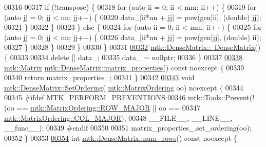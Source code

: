 \begin{DoxyCode}
00316 
00317   \textcolor{keywordflow}{if} (!transpose) \{
00318     \textcolor{keywordflow}{for} (\textcolor{keyword}{auto} ii = 0; ii < mm; ii++) \{
00319       \textcolor{keywordflow}{for} (\textcolor{keyword}{auto} jj = 0; jj < nn; jj++) \{
00320         data\_[ii*nn + jj] = pow(gen[ii], (\textcolor{keywordtype}{double}) jj);
00321       \}
00322     \}
00323   \} \textcolor{keywordflow}{else} \{
00324     \textcolor{keywordflow}{for} (\textcolor{keyword}{auto} ii = 0; ii < mm; ii++) \{
00325       \textcolor{keywordflow}{for} (\textcolor{keyword}{auto} jj = 0; jj < nn; jj++) \{
00326         data\_[ii*nn + jj] = pow(gen[jj], (\textcolor{keywordtype}{double}) ii);
00327       \}
00328     \}
00329   \}
00330 \}
00331 
\hypertarget{mtk__dense__matrix_8cc_source_l00332}{}\hyperlink{classmtk_1_1DenseMatrix_a8d4a0df33bd4e4edf5d2fe5539885b85}{00332} \hyperlink{classmtk_1_1DenseMatrix_a8d4a0df33bd4e4edf5d2fe5539885b85}{mtk::DenseMatrix::~DenseMatrix}() \{
00333 
00334   \textcolor{keyword}{delete} [] data\_;
00335   data\_ = \textcolor{keyword}{nullptr};
00336 \}
00337 
\hypertarget{mtk__dense__matrix_8cc_source_l00338}{}\hyperlink{classmtk_1_1DenseMatrix_a5aa83a0643f27a4652ea97630edf7143}{00338} \hyperlink{classmtk_1_1Matrix}{mtk::Matrix} \hyperlink{classmtk_1_1DenseMatrix_a5aa83a0643f27a4652ea97630edf7143}{mtk::DenseMatrix::matrix\_properties}() const 
      noexcept \{
00339 
00340   \textcolor{keywordflow}{return} matrix\_properties\_;
00341 \}
00342 
\hypertarget{mtk__dense__matrix_8cc_source_l00343}{}\hyperlink{classmtk_1_1DenseMatrix_a178e63f365cf8c547dc5020c60357f5e}{00343} \textcolor{keywordtype}{void} \hyperlink{classmtk_1_1DenseMatrix_a178e63f365cf8c547dc5020c60357f5e}{mtk::DenseMatrix::SetOrdering}(
      \hyperlink{group__c02-enums_ga622801bd9f912d0f976c3e383f5f581c}{mtk::MatrixOrdering} oo) noexcept \{
00344 
00345 \textcolor{preprocessor}{  #ifdef MTK\_PERFORM\_PREVENTIONS}
00346   \hyperlink{classmtk_1_1Tools_a332324c6f25e66be9dff48c5987a3b9f}{mtk::Tools::Prevent}(!(oo == \hyperlink{namespacemtk_ga622801bd9f912d0f976c3e383f5f581ca21541962976d7709c26e9cd8385bd648}{mtk::MatrixOrdering::ROW\_MAJOR}
       || oo ==
00347 \hyperlink{namespacemtk_ga622801bd9f912d0f976c3e383f5f581ca34d2765ffc490951febdcca04bc4f7cd}{mtk::MatrixOrdering::COL\_MAJOR}),
00348                       \_\_FILE\_\_, \_\_LINE\_\_, \_\_func\_\_);
00349 \textcolor{preprocessor}{  #endif}
00350 
00351   matrix\_properties\_.set\_ordering(oo);
00352 \}
00353 
\hypertarget{mtk__dense__matrix_8cc_source_l00354}{}\hyperlink{classmtk_1_1DenseMatrix_a53f3afb3b6a8d21854458aaa9663cc74}{00354} \textcolor{keywordtype}{int} \hyperlink{classmtk_1_1DenseMatrix_a53f3afb3b6a8d21854458aaa9663cc74}{mtk::DenseMatrix::num\_rows}() const noexcept \{

\end{DoxyCode}
